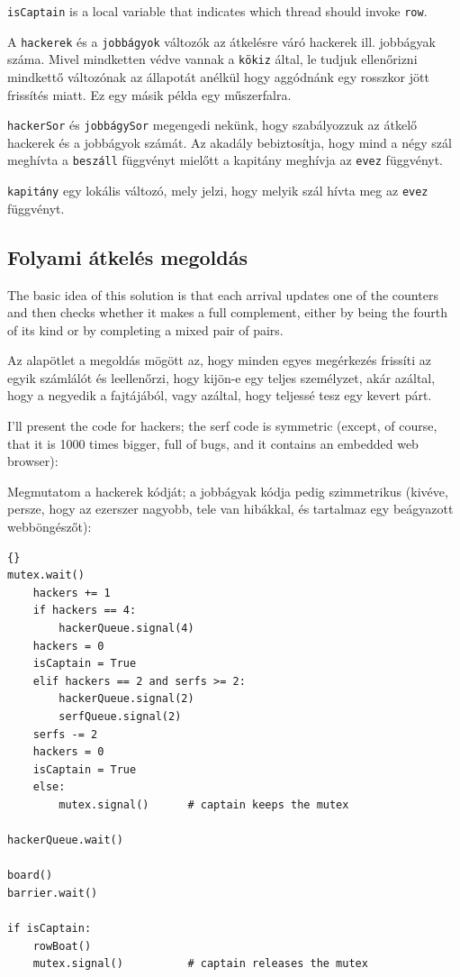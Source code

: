 \documentclass{book}
\newcommand{\clearemptydoublepage}{\newpage\cleardoublepage}
\begin{document}
{\tt isCaptain} is a local variable that
indicates which thread should invoke {\tt row}.

A {\tt hackerek} és a {\tt jobbágyok} változók az átkelésre váró hackerek ill.
jobbágyak száma. Mivel mindketten védve vannak a {\tt kökiz} által, le
tudjuk ellenőrizni mindkettő változónak az állapotát anélkül hogy
aggódnánk egy rosszkor jött frissítés miatt. Ez egy másik példa egy
műszerfalra.

{\tt hackerSor} és {\tt jobbágySor} megengedi nekünk, hogy szabályozzuk az
átkelő hackerek és a jobbágyok számát. Az akadály bebiztosítja, hogy
mind a négy szál meghívta a {\tt beszáll} függvényt mielőtt a kapitány meghívja az
{\tt evez} függvényt.

{\tt kapitány} egy lokális változó, mely jelzi, hogy melyik szál hívta meg az
{\tt evez} függvényt.

\clearemptydoublepage
\subsection{Folyami átkelés megoldás}

The basic idea of this solution is that each arrival updates
one of the counters and then checks whether it makes a
full complement, either by being the fourth of its kind or
by completing a mixed pair of pairs.

Az alapötlet a megoldás mögött az, hogy minden egyes megérkezés
frissíti az egyik számlálót és leellenőrzi, hogy kijön-e egy teljes
személyzet, akár azáltal, hogy a negyedik a fajtájából, vagy
azáltal, hogy teljessé tesz egy kevert párt.

I'll present the code for hackers; the serf code is
symmetric (except, of course, that it is 1000 times bigger,
full of bugs, and it contains an embedded web browser):

Megmutatom a hackerek kódját; a jobbágyak kódja pedig szimmetrikus
(kivéve, persze, hogy az ezerszer nagyobb, tele van hibákkal, és tartalmaz
egy beágyazott webböngészőt):

\begin{lstlisting}[title={River crossing solution}]{}
mutex.wait()
    hackers += 1
    if hackers == 4:
        hackerQueue.signal(4)                
	hackers = 0
	isCaptain = True
    elif hackers == 2 and serfs >= 2:
        hackerQueue.signal(2)                
        serfQueue.signal(2)                  
	serfs -= 2
	hackers = 0
	isCaptain = True
    else:
        mutex.signal()      # captain keeps the mutex

hackerQueue.wait()           

board()
barrier.wait()            

if isCaptain:
    rowBoat()
    mutex.signal()          # captain releases the mutex
\end{lstlisting}
\end{document}

